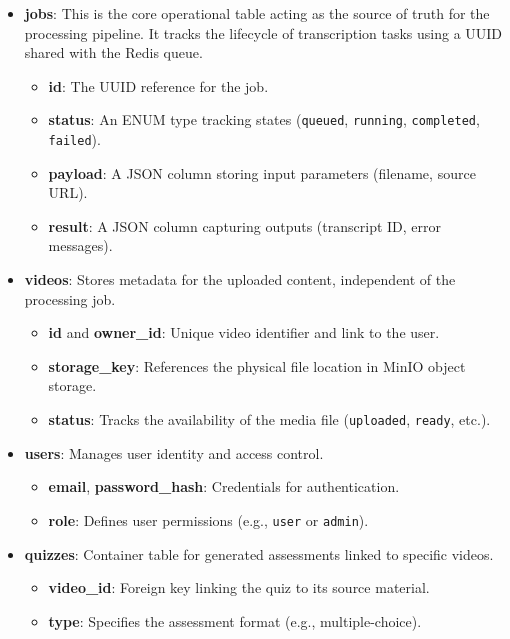 \begin{itemize}
    \item \textbf{jobs}: This is the core operational table acting as the source of truth for the processing pipeline. It tracks the lifecycle of transcription tasks using a UUID shared with the Redis queue.
    \begin{itemize}
        \item \textbf{id}: The UUID reference for the job.
        \item \textbf{status}: An ENUM type tracking states (\texttt{queued}, \texttt{running}, \texttt{completed}, \texttt{failed}).
        \item \textbf{payload}: A JSON column storing input parameters (filename, source URL).
        \item \textbf{result}: A JSON column capturing outputs (transcript ID, error messages).
    \end{itemize}

    \item \textbf{videos}: Stores metadata for the uploaded content, independent of the processing job.
    \begin{itemize}
        \item \textbf{id} and \textbf{owner\_id}: Unique video identifier and link to the user.
        \item \textbf{storage\_key}: References the physical file location in MinIO object storage.
        \item \textbf{status}: Tracks the availability of the media file (\texttt{uploaded}, \texttt{ready}, etc.).
    \end{itemize}

    \item \textbf{users}: Manages user identity and access control.
    \begin{itemize}
        \item \textbf{email}, \textbf{password\_hash}: Credentials for authentication.
        \item \textbf{role}: Defines user permissions (e.g., \texttt{user} or \texttt{admin}).
    \end{itemize}

    \item \textbf{quizzes}: Container table for generated assessments linked to specific videos.
    \begin{itemize}
        \item \textbf{video\_id}: Foreign key linking the quiz to its source material.
        \item \textbf{type}: Specifies the assessment format (e.g., multiple-choice).
    \end{itemize}


\end{itemize}
